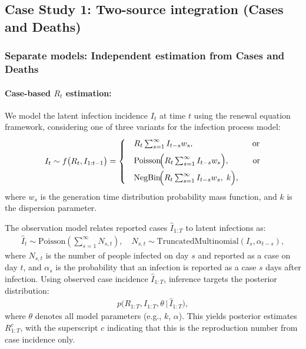 \documentclass{article}
\begin{document}
\subsection{Case Study 1: Two-source integration (Cases and Deaths)}

\subsubsection{Separate models: Independent estimation from Cases and Deaths}

\paragraph{Case-based $R_{t}$ estimation:}
We model the latent infection incidence $I_{t}$ at time $t$ using the renewal equation framework, considering one of three variants for the infection process model:
\begin{align}\label{latent_inf}
I_t \sim f\big(R_t, I_{1:t-1}\big) =
\begin{cases} 
 & R_t \sum_{s=1}^\infty I_{t-s} w_s, \hspace{2.5cm}\text{or}\\[5pt]
 & \mathrm{Poisson}\!\Big(R_t \sum_{s=1}^\infty I_{t-s} w_s\Big), \hspace{1cm}\text{or}\\[5pt]
 & \mathrm{NegBin}\!\Big(R_t \sum_{s=1}^\infty I_{t-s} w_s,\; k\Big),
\end{cases}
\end{align}
where $w_s$ is the generation time distribution probability mass function, and $k$ is the dispersion parameter.

The observation model relates reported cases $\widehat{I}_{1:T}$ to latent infections as:
\begin{align}\label{obs_inf}
\widehat{I}_t \sim \mathrm{Poisson}\left( \sum_{s=1}^\infty N_{s,t} \right), \quad N_{s,t} \sim \mathrm{TruncatedMultinomial}(I_s, \alpha_{t-s}),
\end{align}
where $N_{s,t}$ is the number of people infected on day $s$ and reported as a case on day $t$, and $\alpha_s$ is the probability that an infection is reported as a case $s$ days after infection. Using observed case incidence $\widehat{I}_{1:T}$, inference targets the posterior distribution:
\begin{align}
p\big(R_{1:T}, I_{1:T}, \theta \,\big|\, \widehat{I}_{1:T}\big),
\end{align}
where $\theta$ denotes all model parameters (e.g., $k$, $\alpha$). This yields posterior estimates $R_{1:T}^{c}$, with the superscript $c$ indicating that this is the reproduction number from case incidence only.
\end{document}
